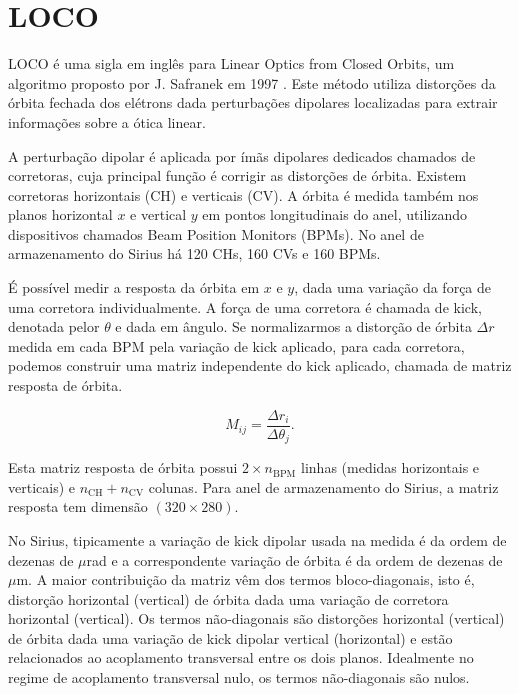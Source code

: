 \chapter{LOCO}

LOCO é uma sigla em inglês para Linear Optics from Closed Orbits, um algoritmo proposto por J. Safranek em 1997 \cite{safranek}. Este método utiliza distorções da órbita fechada dos elétrons dada perturbações dipolares localizadas para extrair informações sobre a ótica linear. 

A perturbação dipolar é aplicada por ímãs dipolares dedicados chamados de corretoras, cuja principal função é corrigir as distorções de órbita. Existem corretoras horizontais (CH) e verticais (CV). A órbita é medida também nos planos horizontal $x$ e vertical $y$ em pontos longitudinais do anel, utilizando dispositivos chamados Beam Position Monitors (BPMs). No anel de armazenamento do Sirius há 120 CHs, 160 CVs e 160 BPMs.

É possível medir a resposta da órbita em $x$ e $y$, dada uma variação da força de uma corretora individualmente. A força de uma corretora é chamada de kick, denotada pelor $\theta$ e dada em ângulo. Se normalizarmos a distorção de órbita $\Delta r$ medida em cada BPM pela variação de kick aplicado, para cada corretora, podemos construir uma matriz independente do kick aplicado, chamada de matriz resposta de órbita.

\begin{equation}
    M_{ij} = \dfrac{\Delta r_i}{\Delta \theta_j}.
\end{equation}

Esta matriz resposta de órbita possui $2 \times n_{\mathrm{BPM}}$ linhas (medidas horizontais e verticais) e $n_\mathrm{{CH}} + n_{\mathrm{CV}}$ colunas. Para anel de armazenamento do Sirius, a matriz resposta tem dimensão $(320 \times 280)$. 

No Sirius, tipicamente a variação de kick dipolar usada na medida é da ordem de dezenas de $\mu$rad e a correspondente variação de órbita é da ordem de dezenas de $\mu$m. A maior contribuição da matriz vêm dos termos bloco-diagonais, isto é, distorção horizontal (vertical) de órbita dada uma variação de corretora horizontal (vertical). Os termos não-diagonais são distorções horizontal (vertical) de órbita dada uma variação de kick dipolar vertical (horizontal) e estão relacionados ao acoplamento transversal entre os dois planos. Idealmente no regime de acoplamento transversal nulo, os termos não-diagonais são nulos.

